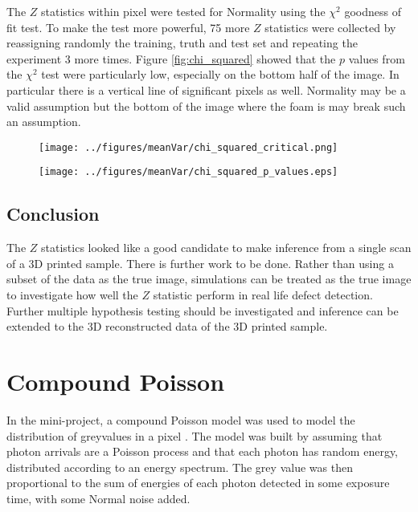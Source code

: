 \documentclass[a4paper]{proc}
\begin{document}
The $Z$ statistics within pixel were tested for Normality  using the $\chi^2$ goodness of fit test. To make the test more powerful, 75 more $Z$ statistics were collected by reassigning randomly the training, truth and test set and repeating the experiment 3 more times. Figure \ref{fig:chi_squared} showed that the $p$ values from the $\chi^2$ test were particularly low, especially on the bottom half of the image. In particular there is a vertical line of significant pixels as well. Normality may be a valid assumption but the bottom of the image where the foam is may break such an assumption.

\begin{figure*}
	\centering
	\begin{subfigure}{0.45\textwidth}
		\texttt{[image: ../figures/meanVar/chi\_squared\_critical.png]}
	\end{subfigure}
	\begin{subfigure}{0.45\textwidth}
		\texttt{[image: ../figures/meanVar/chi\_squared\_p\_values.eps]}
	\end{subfigure}
	\caption{$p$ values from the $\chi^2$ goodness of fit test within pixel. Highlighted in red are significant pixels at the $2\sigma$ significant level corrected for multiply testing using the Bonferroni correction.}
	\label{fig:chi_squared}
\end{figure*}

\subsection{Conclusion}
The $Z$ statistics looked like a good candidate to make inference from a single scan of a 3D printed sample. There is further work to be done. Rather than using a subset of the data as the true image, simulations can be treated as the true image to investigate how well the $Z$ statistic perform in real life defect detection. Further multiple hypothesis testing should be investigated and inference can be extended to the 3D reconstructed data of the 3D printed sample.

\section{Compound Poisson}
In the mini-project, a compound Poisson model was used to model the distribution of greyvalues in a pixel \cite{ip2016inside}. The model was built by assuming that photon arrivals are a Poisson process and that each photon has random energy, distributed according to an energy spectrum. The grey value was then proportional to the sum of energies of each photon detected in some exposure time, with some Normal noise added.
\end{document}

